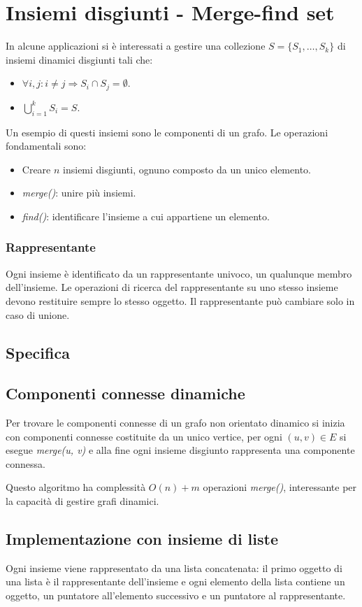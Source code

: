 \section{Insiemi disgiunti - Merge-find set}
In alcune applicazioni si \`e interessati a gestire una collezione $S=\{S_1, \dots, S_k\}$ di insiemi dinamici disgiunti tali che:
\begin{itemize}
\item $\forall i, j: i\neq j\Rightarrow S_i\cap S_j = \emptyset$.
\item $\bigcup\limits_{i =1}^k S_i = S$.
\end{itemize}
Un esempio di questi insiemi sono le componenti di un grafo. Le operazioni fondamentali sono: 
\begin{itemize}
\item Creare $n$ insiemi disgiunti, ognuno composto da un unico elemento.
\item \emph{merge()}: unire pi\`u insiemi.
\item \emph{find()}: identificare l'insieme a cui appartiene un elemento.
\end{itemize}
\subsubsection{Rappresentante}
Ogni insieme \`e identificato da un rappresentante univoco, un qualunque membro dell'insieme. Le operazioni di ricerca del rappresentante su uno stesso insieme devono restituire sempre lo stesso oggetto. Il
rappresentante pu\`o cambiare solo in caso di unione.
\subsection{Specifica}

\subsection{Componenti connesse dinamiche}
\begin{multicols}{2}
Per trovare le componenti connesse di un grafo non orientato dinamico si inizia con componenti connesse costituite da un unico vertice, per ogni $(u, v)\in E$ si esegue \emph{merge(u, v)} e alla fine ogni insieme
disgiunto rappresenta una componente connessa.

\end{multicols}
Questo algoritmo ha complessit\`a $O(n)+m$ operazioni \emph{merge()}, interessante per la capacit\`a di gestire grafi dinamici.
\subsection{Implementazione con insieme di liste}
Ogni insieme viene rappresentato da una lista concatenata: il primo oggetto di una lista \`e il rappresentante dell'insieme e ogni elemento della lista contiene un oggetto, un puntatore all'elemento successivo e
un puntatore al rappresentante. 
